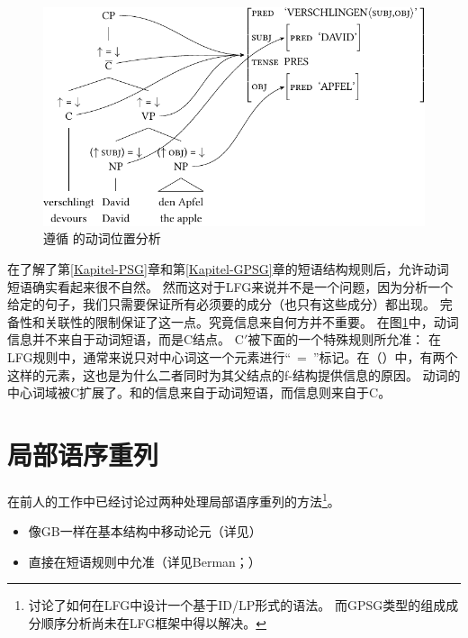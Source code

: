 \begin{figure}
\centerline{%
\includegraphics{Figures/verschlingt-david-den-apfel-lfg-lsp-crop}
}
\caption{\label{Abb-Verbstellung-LFG}遵循 \citet[]{Berman2003a}的动词位置分析}
\end{figure}%

在了解了第\ref{Kapitel-PSG}章和第\ref{Kapitel-GPSG}章的短语结构规则后，允许动词短语确实看起来很不自然。
然而这对于LFG来说并不是一个问题，因为分析一个给定的句子，我们只需要保证所有必须要的成分（也只有这些成分）都出现。 
完备性和关联性的限制保证了这一点。究竟信息来自何方并不重要。
在图\ref{Abb-Verbstellung-LFG}中，动词信息并不来自于动词短语，而是C结点。
C$'$被下面的一个特殊规则所允准：
\ea
{}
\z
在LFG规则中，通常来说只对中心词这一个元素进行“\up~=~\down”标记。在（）中，有两个这样的元素，这也是为什么二者同时为其父结点的f-结构提供信息的原因。
动词的中心词域被C扩展了。\lfgsubj 和\lfgobj 的信息来自于动词短语，而\pred 信息则来自于C。 

\section{局部语序重列}
\label{Abschnitt-LFG-Umstellung}

在前人的工作中已经讨论过两种处理局部语序重列的方法\footnote{%
   \citet[--21]{Kaplan95a}讨论了如何在LFG中设计一个基于ID/LP形式的语法。
  而GPSG类型的组成成分顺序分析尚未在LFG框架中得以解决。%
}。
\begin{itemize}
\item 像GB\indexgbc 一样在基本结构中移动论元（详见\citealp{Choi99a-u}）
\item 直接在短语规则中允准（详见Berman\citeyear[\S~2.1.3.1]{Berman96a-u}；\citeyear{Berman2003a}）
\end{itemize}

